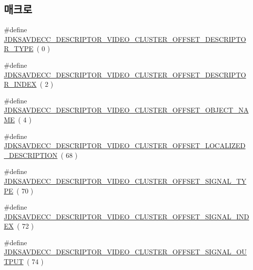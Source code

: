 \subsection*{매크로}
\begin{DoxyCompactItemize}
\item 
\#define \hyperlink{group__descriptor__video__cluster_ga8d72cf49e3756f00b7d9ac453fb878b6}{J\+D\+K\+S\+A\+V\+D\+E\+C\+C\+\_\+\+D\+E\+S\+C\+R\+I\+P\+T\+O\+R\+\_\+\+V\+I\+D\+E\+O\+\_\+\+C\+L\+U\+S\+T\+E\+R\+\_\+\+O\+F\+F\+S\+E\+T\+\_\+\+D\+E\+S\+C\+R\+I\+P\+T\+O\+R\+\_\+\+T\+Y\+PE}~( 0 )
\item 
\#define \hyperlink{group__descriptor__video__cluster_ga51b18060a0b87cd8d53a50e255f06294}{J\+D\+K\+S\+A\+V\+D\+E\+C\+C\+\_\+\+D\+E\+S\+C\+R\+I\+P\+T\+O\+R\+\_\+\+V\+I\+D\+E\+O\+\_\+\+C\+L\+U\+S\+T\+E\+R\+\_\+\+O\+F\+F\+S\+E\+T\+\_\+\+D\+E\+S\+C\+R\+I\+P\+T\+O\+R\+\_\+\+I\+N\+D\+EX}~( 2 )
\item 
\#define \hyperlink{group__descriptor__video__cluster_ga9e64a77e4e464c7434106a234847044d}{J\+D\+K\+S\+A\+V\+D\+E\+C\+C\+\_\+\+D\+E\+S\+C\+R\+I\+P\+T\+O\+R\+\_\+\+V\+I\+D\+E\+O\+\_\+\+C\+L\+U\+S\+T\+E\+R\+\_\+\+O\+F\+F\+S\+E\+T\+\_\+\+O\+B\+J\+E\+C\+T\+\_\+\+N\+A\+ME}~( 4 )
\item 
\#define \hyperlink{group__descriptor__video__cluster_gaecd89c4111cc0f6278ce6dc55b3faad8}{J\+D\+K\+S\+A\+V\+D\+E\+C\+C\+\_\+\+D\+E\+S\+C\+R\+I\+P\+T\+O\+R\+\_\+\+V\+I\+D\+E\+O\+\_\+\+C\+L\+U\+S\+T\+E\+R\+\_\+\+O\+F\+F\+S\+E\+T\+\_\+\+L\+O\+C\+A\+L\+I\+Z\+E\+D\+\_\+\+D\+E\+S\+C\+R\+I\+P\+T\+I\+ON}~( 68 )
\item 
\#define \hyperlink{group__descriptor__video__cluster_ga216e3bd418e1ae33fa2654b063377d5f}{J\+D\+K\+S\+A\+V\+D\+E\+C\+C\+\_\+\+D\+E\+S\+C\+R\+I\+P\+T\+O\+R\+\_\+\+V\+I\+D\+E\+O\+\_\+\+C\+L\+U\+S\+T\+E\+R\+\_\+\+O\+F\+F\+S\+E\+T\+\_\+\+S\+I\+G\+N\+A\+L\+\_\+\+T\+Y\+PE}~( 70 )
\item 
\#define \hyperlink{group__descriptor__video__cluster_ga8c24c8b959a9622b3a4891c46ede5409}{J\+D\+K\+S\+A\+V\+D\+E\+C\+C\+\_\+\+D\+E\+S\+C\+R\+I\+P\+T\+O\+R\+\_\+\+V\+I\+D\+E\+O\+\_\+\+C\+L\+U\+S\+T\+E\+R\+\_\+\+O\+F\+F\+S\+E\+T\+\_\+\+S\+I\+G\+N\+A\+L\+\_\+\+I\+N\+D\+EX}~( 72 )
\item 
\#define \hyperlink{group__descriptor__video__cluster_gaacab9e5be427064d5d4e5fb98c269b7f}{J\+D\+K\+S\+A\+V\+D\+E\+C\+C\+\_\+\+D\+E\+S\+C\+R\+I\+P\+T\+O\+R\+\_\+\+V\+I\+D\+E\+O\+\_\+\+C\+L\+U\+S\+T\+E\+R\+\_\+\+O\+F\+F\+S\+E\+T\+\_\+\+S\+I\+G\+N\+A\+L\+\_\+\+O\+U\+T\+P\+UT}~( 74 )
\item 

\end{DoxyCompactItemize}
